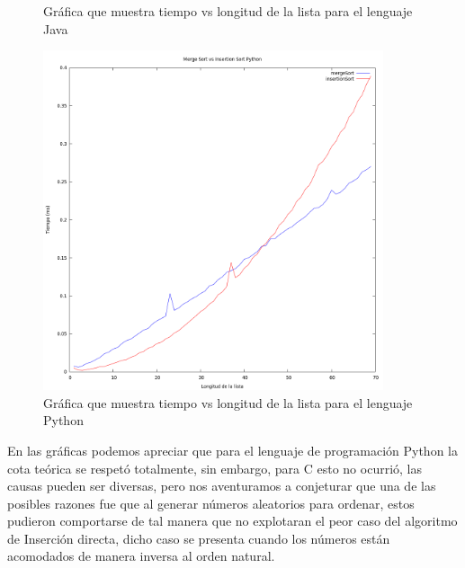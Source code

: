\documentclass[11 pt, a4paper]{article}
\theoremstyle{definition}
\begin{document}
\begin{enumerate}
\begin{itemize}
\begin{figure}[H]
          \caption{Gráfica que muestra tiempo vs longitud de la lista para el lenguaje Java}
      \end{figure}
\begin{figure}[H]
         \centering
          \includegraphics[trim=0cm 0cm 0cm 0cm, width=10cm]{Python.png} 
          \caption{Gráfica que muestra tiempo vs longitud de la lista para el lenguaje Python}
      \end{figure}
	En las gráficas podemos apreciar que para el lenguaje de
	programación Python la cota teórica se respetó totalmente, 
	sin embargo, para C esto no ocurrió, las causas pueden ser
	diversas, pero nos aventuramos a conjeturar que una de las
	posibles razones fue que al generar números aleatorios para
	ordenar, estos pudieron comportarse de tal manera que no
	explotaran el peor caso del algoritmo de Inserción directa,
	dicho caso se presenta cuando los números están acomodados
	de manera inversa al orden natural. 
	

\end{itemize}
\end{enumerate}
\end{document}
